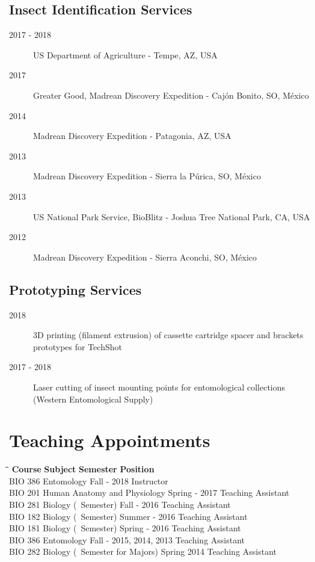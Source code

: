 \documentclass[12pt,a4paper]{article}
\begin{document}
	\subsection*{Insect Identification Services}
		\begin{description}
			\item [2017 - 2018] US Department of Agriculture - Tempe, AZ, USA
			\item [2017] Greater Good, Madrean Discovery Expedition - Caj\'{o}n Bonito, SO, M\'{e}xico
			\item [2014] Madrean Discovery Expedition - Patagonia, AZ, USA
			\item [2013] Madrean Discovery Expedition - Sierra la P\'{u}rica, SO, M\'{e}xico
			\item [2013] US National Park Service, BioBlitz - Joshua Tree National Park, CA, USA
			\item [2012] Madrean Discovery Expedition - Sierra Aconchi, SO, M\'{e}xico
		\end{description}
	
	\subsection*{Prototyping Services}
		\begin{description}
			\item [2018] 3D printing (filament extrusion) of cassette cartridge spacer and brackets prototypes for TechShot
			\item [2017 - 2018] Laser cutting of insect mounting points for entomological collections (Western Entomological Supply)
		\end{description}

\section*{Teaching Appointments}

	\begin{tabbing}
	\hspace{2cm}\=\hspace{6.5cm}\=\hspace{4cm}\=\kill
	\textbf{Course} \> \textbf{Subject} \> \textbf{Semester} \> \textbf{Position}\\
	BIO 386 \> Entomology \> Fall - 2018 \> Instructor \\ 
	BIO 201 \> Human Anatomy and Physiology \> Spring - 2017 \> Teaching Assistant \\
	BIO 281 \> Biology (~Semester) \> Fall - 2016 \> Teaching Assistant \\
	BIO 182 \> Biology (~Semester) \> Summer - 2016 \> Teaching Assistant \\
	BIO 181 \> Biology (~Semester) \> Spring - 2016 \> Teaching Assistant \\
	BIO 386 \> Entomology \> Fall - 2015, 2014, 2013 \> Teaching Assistant \\
	BIO 282 \> Biology (~Semester for Majors) \> Spring 2014 \> Teaching Assistant
	\end{tabbing} 
\end{document}
